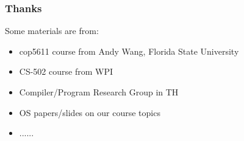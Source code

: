\begin{frame}[plain]	
	\frametitle{Thanks}
	
	\LARGE
	Some materials are from:
	\begin{itemize}\Large

		\item cop5611 course from Andy Wang, Florida State University
		\item CS-502 course from WPI
		\item Compiler/Program Research Group in TH
		\item OS papers/slides on our course topics
		\item ......

	\end{itemize}
	
	
\end{frame}
